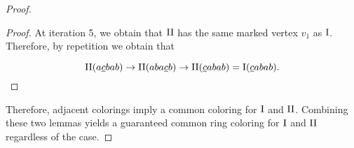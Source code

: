 \begin{proof}
\begin{proof}
At iteration 5, we obtain that $\text{II}$ has the same marked vertex $v_1$ as $\text{I}$. Therefore, by repetition we obtain that

\begin{equation}
    \text{II}(a\underline{c}bab) \rightarrow \text{II}(aba\underline{c}b) \rightarrow \text{II}(\underline{c}abab) = \text{I}(\underline{c}abab).
\end{equation}

\end{proof}

Therefore, adjacent colorings imply a common coloring for $\text{I}$ and $\text{II}$. Combining these two lemmas yields a guaranteed common ring coloring for $\text{I}$ and $\text{II}$ regardless of the case.

\end{proof}